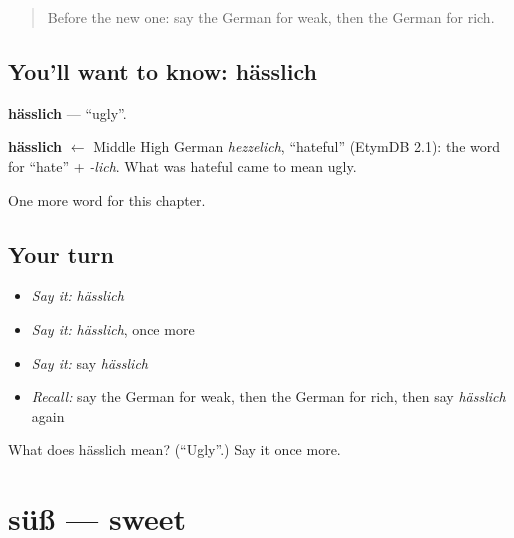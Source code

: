 \label{lesson:GE-C91-haesslich}



\begin{quote}
Before the new one: say the German for weak, then the German for rich.
\end{quote}

\subsection*{You'll want to know: hässlich}
\textbf{hässlich} — \textquotedblleft{}ugly\textquotedblright{}.

\begin{cousinweb}
\textbf{hässlich} $\leftarrow$ Middle High German \emph{hezzelich}, \textquotedblleft{}hateful\textquotedblright{} (EtymDB 2.1): the word for \textquotedblleft{}hate\textquotedblright{} + \emph{-lich}. What was hateful came to mean ugly.
\end{cousinweb}

\begin{grammarlens}[title={What you've built}]
One more word for this chapter.
\end{grammarlens}

\subsection*{Your turn}
\begin{itemize}
\raggedright
  \item \emph{Say it:} \emph{hässlich}
  \item \emph{Say it:} \emph{hässlich}, once more
  \item \emph{Say it:} say \emph{hässlich}
  \item \emph{Recall:} say the German for weak, then the German for rich, then say \emph{hässlich} again
\end{itemize}

\begin{tcolorbox}[breakable,colback=teal!4,colframe=teal!35!black,title={Before you move on}]
What does hässlich mean? (\textquotedblleft{}Ugly\textquotedblright{}.) Say it once more.
\end{tcolorbox}
\section[süß]{süß — sweet}

\label{lesson:GE-C91-suess}



